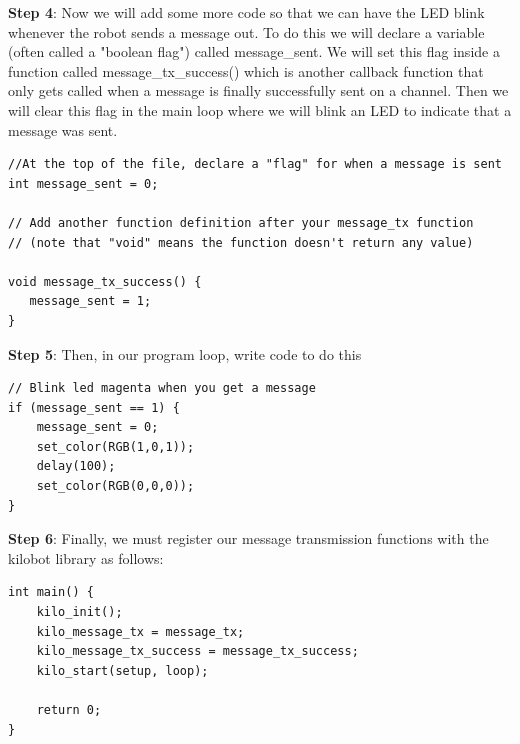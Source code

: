 \documentclass{report}[12pt]
\begin{document}
\noindent \textbf{Step 4}:
 Now we will add some more code so that we can have the LED blink whenever the robot sends a message out. To do this we will declare a variable (often called a "boolean flag") called message\_sent. We will set this flag inside a function called message\_tx\_success() which is another callback function that only gets called when a message is finally successfully sent on a channel. Then we will clear this flag in the main loop where we will blink an LED to indicate that a message was sent. 
\begin{verbatim}
//At the top of the file, declare a "flag" for when a message is sent
int message_sent = 0;

// Add another function definition after your message_tx function
// (note that "void" means the function doesn't return any value)

void message_tx_success() {
   message_sent = 1;
}
\end{verbatim}

\noindent \textbf{Step 5}:
Then, in our program loop, write code to do this

\begin{verbatim}
// Blink led magenta when you get a message
if (message_sent == 1) {
    message_sent = 0;
    set_color(RGB(1,0,1));
    delay(100);
    set_color(RGB(0,0,0));
}
\end{verbatim}

\noindent \textbf{Step 6}:
Finally, we must register our message transmission functions with the kilobot library as follows:
\begin{verbatim}
int main() {
    kilo_init();
    kilo_message_tx = message_tx;
    kilo_message_tx_success = message_tx_success;
    kilo_start(setup, loop);

    return 0;
}

\end{verbatim}
\end{document}
